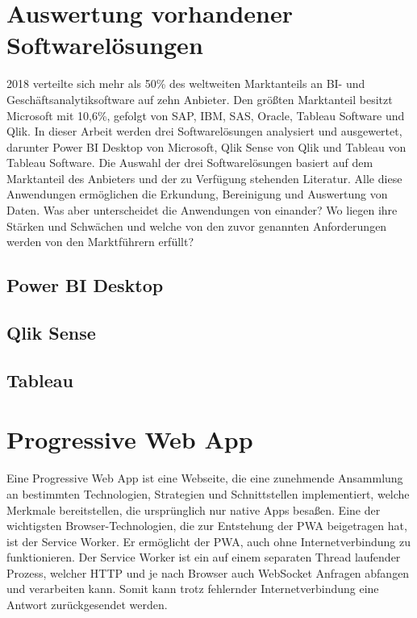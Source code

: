 \section{Auswertung vorhandener Softwarelösungen}
2018 verteilte sich mehr als 50\% des weltweiten Marktanteils an BI- und Geschäftsanalytiksoftware auf
zehn Anbieter. Den größten Marktanteil besitzt Microsoft mit 10,6\%, gefolgt von SAP, IBM, SAS, Oracle,
Tableau Software und Qlik.\cite{StatistaMarketshareBI}
In dieser Arbeit werden drei Softwarelösungen analysiert und ausgewertet, darunter Power BI Desktop von
Microsoft, Qlik Sense von Qlik und Tableau von Tableau Software. Die Auswahl der drei Softwarelösungen
basiert auf dem Marktanteil des Anbieters und der zu Verfügung stehenden Literatur. Alle diese 
Anwendungen ermöglichen die Erkundung, Bereinigung und Auswertung von Daten. Was aber unterscheidet
die Anwendungen von einander? Wo liegen ihre Stärken und Schwächen und welche von den zuvor genannten
Anforderungen werden von den Marktführern erfüllt?

\subsection{Power BI Desktop}


\subsection{Qlik Sense}

\subsection{Tableau}

\section{Progressive Web App}
Eine Progressive Web App ist eine Webseite, die eine zunehmende Ansammlung an bestimmten Technologien,
Strategien und Schnittstellen implementiert, welche Merkmale bereitstellen, die ursprünglich nur
native Apps besaßen.\cite{WikiPWA} Eine der wichtigsten Browser-Technologien, die zur Entstehung der PWA beigetragen hat,
ist der Service Worker. Er ermöglicht der PWA, auch ohne Internetverbindung zu funktionieren. Der 
Service Worker ist ein auf einem separaten Thread laufender Prozess, welcher HTTP und je nach Browser
auch WebSocket Anfragen abfangen und verarbeiten kann. Somit kann trotz fehlernder Internetverbindung
eine Antwort zurückgesendet werden. \cite{W3ServiceWorker}

